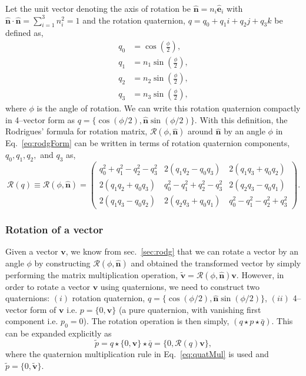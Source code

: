 \documentclass{article}
\def\nh{\hat{\mathbf{n}}}
\def\eh{\hat{\mathbf{e}}}
\def\v{\mathbf{v}}
\def\vt{\tilde{\mathbf{v}}}
\def\R{\mathcal{R}}
\def\nh{\hat{\mathbf{n}}}
\begin{document}
Let the unit vector denoting the axis of rotation be $\nh = n_i \eh_i$ with $\nh \cdot \nh = \sum_{i=1}^3 n_i^2 = 1$ and the rotation quaternion, $q = q_0 + q_1i + q_2j + q_3k$ be defined as,
\begin{align*}
    q_0 &= \cos\left(\frac{\phi}{2}\right), \\
    q_1 &= n_1 \sin\left(\frac{\phi}{2}\right), \\
    q_2 &= n_2 \sin\left(\frac{\phi}{2}\right), \\
    q_3 &= n_3 \sin\left(\frac{\phi}{2}\right),
\end{align*}
where $\phi$ is the angle of rotation. We can write this rotation quaternion compactly in 4--vector form as $q = \{ \cos (\phi/2), \nh \sin(\phi/2) \}$. With this definition, the Rodrigues' formula for rotation matrix, $\R(\phi,\nh)$ around $\nh$ by an angle $\phi$ in Eq.~\ref{eq:rodgForm} can be written in terms of rotation quaternion components, \( q_0, q_1, q_2, \) and \( q_3 \) as,
\begin{equation}
\R(q) \equiv \R(\phi, \nh) = \begin{pmatrix}
    q_0^2 + q_1^2 - q_2^2 - q_3^2 & 2(q_1q_2 - q_0q_3) & 2(q_1q_3 + q_0q_2) \\
    2(q_1q_2 + q_0q_3) & q_0^2 - q_1^2 + q_2^2 - q_3^2 & 2(q_2q_3 - q_0q_1) \\
    2(q_1q_3 - q_0q_2) & 2(q_2q_3 + q_0q_1) & q_0^2 - q_1^2 - q_2^2 + q_3^2
\end{pmatrix}.
\end{equation}

\subsubsection*{Rotation of a vector}
Given a vector $\v$, we know from sec.~\ref{sec:rodg} that we can rotate a vector by an angle $\phi$ by constructing $\R(\phi, \nh)$ and obtained the transformed vector by simply performing the matrix multiplication operation, $\vt = \R(\phi, \nh) \v$. However, in order to rotate a vector $\v$ using quaternions, we need to construct two quaternions: $(i)$ rotation quaternion, $q = \{ \cos (\phi/2), \nh \sin(\phi/2) \}$, $(ii)$ 4--vector form of $\v$ i.e. $p = \{0, \v\}$ (a pure quaternion, with vanishing first component i.e. $p_0=0$). The rotation operation is then simply, $(q \star p \star \bar{q})$. This can be expanded explicitly as
\[
  \tilde{p} = q \star \{ 0, \v \} \star \bar{q} = \{ 0, \R(q) \v \},
\]
where the quaternion multiplication rule in Eq.~\ref{eq:quatMul} is used and $\tilde{p} = \{ 0, \vt \} $.
\end{document}
